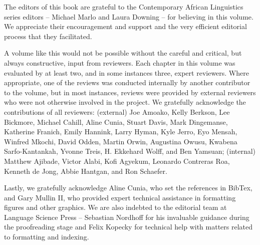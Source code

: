 \addchap{\lsAcknowledgementTitle} 

The editors of this book are grateful to the Contemporary African Linguistics series editors -- Michael Marlo and Laura Downing -- for believing in this volume. We appreciate their encouragement and support and the very efficient editorial process that they facilitated.

A volume like this would not be possible without the careful and critical, but always constructive, input from reviewers. Each chapter in this volume was evaluated by at least two, and in some instances three, expert reviewers. Where appropriate, one of the reviews was conducted internally by another contributor to the volume, but in most instances, reviews were provided by external reviewers who were not otherwise involved in the project. We gratefully acknowledge the contributions of all reviewers: (external) Joe Amoako, Kelly Berkson, Lee Bickmore, Michael Cahill, Aline Cunia, Stuart Davis, Mark Dingemanse, Katherine Franich, Emily Hannink, Larry Hyman, Kyle Jerro, Eyo Mensah, Winfred Mkochi, David Odden, Martin Orwin, Augustina Owusu, Kwabena Sarfo-Kantankah, Yvonne Treis, H. Ekkehard Wolff, and Ben Yamsuan; (internal) Matthew Ajibade, Victor Alabi, Kofi Agyekum, Leonardo Contreras Roa, Kenneth de Jong, Abbie Hantgan, and Ron Schaefer.

Lastly, we gratefully acknowledge Aline Cunia, who set the references in BibTex, and Gary Mullin II, who provided expert technical assistance in formatting figures and other graphics. We are also indebted to the editorial team at Language Science Press -- Sebastian Nordhoff for his invaluable guidance during the proofreading stage and Felix Kopecky for technical help with matters related to formatting and indexing.